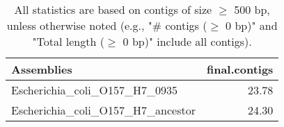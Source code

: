 \documentclass[12pt,a4paper]{article}
\begin{document}
\begin{table}[ht]
\begin{center}
\caption{All statistics are based on contigs of size $\geq$ 500 bp, unless otherwise noted (e.g., "\# contigs ($\geq$ 0 bp)" and "Total length ($\geq$ 0 bp)" include all contigs).}
\begin{tabular}{|l*{1}{|r}|}
\hline
Assemblies & final.contigs \\ \hline
Escherichia\_coli\_O157\_H7\_0935 & 23.78 \\ \hline
Escherichia\_coli\_O157\_H7\_ancestor & 24.30 \\ \hline
\end{tabular}
\end{center}
\end{table}
\end{document}
